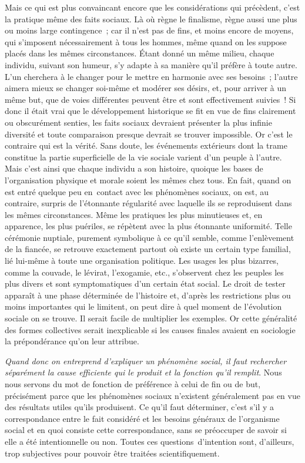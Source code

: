 \documentclass[french,twoside]{book} %
\begin{document}
Mais ce qui est plus convaincant encore que les considérations qui précèdent, c’est la pratique même des faits sociaux. Là où règne le finalisme, règne aussi une plus ou moins large contingence ; car il n’est pas de fins, et moins encore de moyens, qui s’imposent nécessairement à tous les hommes, même quand on les suppose placés dans les mêmes circonstances. Étant donné un même milieu, chaque individu, suivant son humeur, s’y adapte à sa manière qu’il préfère à toute autre. L’un cherchera à le changer pour le mettre en harmonie avec ses besoins ; l’autre aimera mieux se changer soi-même et modérer ses désirs, et, pour arriver à un même but, que de voies différentes peuvent être et sont effectivement suivies ! Si donc il était vrai que le développement historique se fit en vue de fins clairement ou obscurément senties, les faits sociaux devraient présenter la plus infinie diversité et toute comparaison presque devrait se trouver impossible. Or c’est le contraire qui est la vérité. Sans doute, les événements extérieurs dont la trame constitue la partie superficielle de la vie sociale varient d’un peuple à l’autre. Mais c’est ainsi que chaque individu a son histoire, quoique les bases de l’organisation physique et morale soient les mêmes chez tous. En fait, quand on est entré quelque peu en contact avec les phénomènes sociaux, on est, au contraire, surpris de l’étonnante régularité avec laquelle ils se reproduisent dans les mêmes circonstances. Même les pratiques les plus minutieuses et, en apparence, les plus puériles, se répètent avec la plus étonnante uniformité. Telle cérémonie nuptiale, purement symbolique à ce qu’il semble, comme l’enlèvement de la fiancée, se retrouve exactement partout où existe un certain type familial, lié lui-même à toute une organisation politique. Les usages les plus bizarres, comme la couvade, le lévirat, l’exogamie, etc., s’observent chez les peuples les plus divers et sont symptomatiques d’un certain état social. Le droit de tester apparaît à une phase déterminée de l’histoire et, d’après les restrictions plus ou moins importantes qui le limitent, on peut dire à quel moment de l’évolution sociale on se trouve. Il serait facile de multiplier les exemples. Or cette généralité des formes collectives serait inexplicable si les causes finales avaient en sociologie la prépondérance qu’on leur attribue.\par
{\itshape Quand donc on entreprend d’expliquer un phénomène social, il faut rechercher séparément la cause efficiente qui le produit et la fonction qu’il remplit}. Nous nous servons du mot de fonction de préférence à celui de fin ou de but, précisément parce que les phénomènes sociaux n’existent généralement pas en vue des résultats utiles qu’ils produisent. Ce qu’il faut déterminer, c’est s’il y a correspondance entre le fait considéré et les besoins généraux de l’organisme social et en quoi consiste cette correspondance, sans se préoccuper de savoir si elle a été intentionnelle ou non. Toutes ces questions d’intention sont, d’ailleurs, trop subjectives pour pouvoir être traitées scientifiquement.\par
\end{document}
